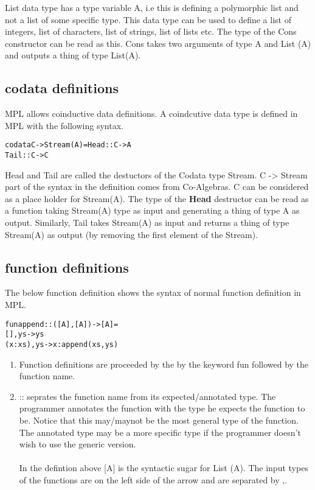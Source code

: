 \documentclass[11pt]{article}
\begin{document}
List data type has a type variable A, i.e this is defining a polymorphic list and not a list of some specific type. This data type can be used to define a list of integers, list of characters, list of strings, list of lists etc. The type of the Cons constructor can be read as this. Cons takes two arguments of type A and List (A) and outputs a thing of type List(A).

\subsection {codata definitions}
MPL allows coinductive data definitions. A coindcutive data type is defined in MPL with the following syntax.

\begin{alltt}
                codata C -> Stream (A) = Head :: C -> A 
                                         Tail :: C -> C  
\end{alltt}

Head and Tail are called the destuctors of the Codata type Stream. C -> Stream part of the syntax in the definition comes from Co-Algebras. C can be considered as a place holder for Stream(A). The type of the {\bf Head} destructor can be read as a function taking Stream(A) type as input and generating a thing of type A as output. Similarly, Tail takes Stream(A) as input and returns a thing of type Stream(A) as output (by removing the first element of the Stream). 

\subsection {function definitions}
The below function definition shows the syntax of normal function definition in MPL. 
~~\\ 
\begin{alltt}
fun append ::([A],[A]) -> [A] = 
     []   , ys     -> ys 
     (x:xs), ys    -> x:append (xs,ys) 
\end{alltt}

\begin {enumerate}
   \item Function definitions are proceeded by the by the keyword fun followed by the function name. 
   \item :: seprates the function name from its expected/annotated type. The programmer annotates the function with the type he expects the function to be.
   Notice that this may/maynot be the most general type of the function. The annotated type may be a more specific type if the programmer doesn't wish to use the generic version.
   ~~\\ ~~\\ 
   In the defintion above [A] is the syntactic sugar for List (A). The input types of the functions are on the left side of the arrow and are separated by ,.
\end {enumerate}
\end{document}
